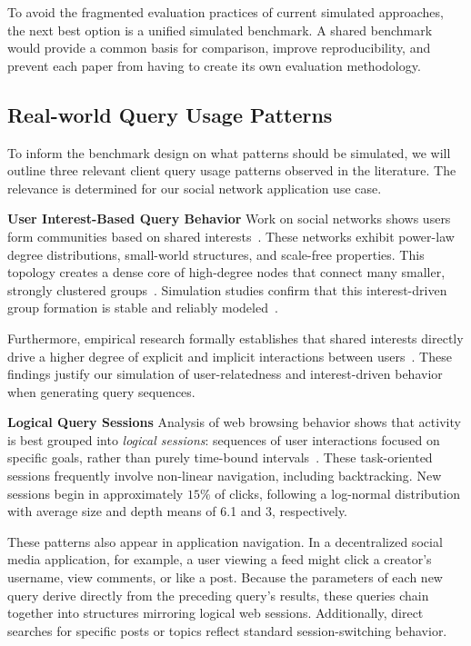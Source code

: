 To avoid the fragmented evaluation practices of current simulated approaches,
the next best option is a unified simulated benchmark. 
A shared benchmark would provide a common basis for comparison, improve reproducibility,
and prevent each paper from having to create its own evaluation methodology.

\subsection{Real-world Query Usage Patterns}
\label{sec:related_work_qup}
To inform the benchmark design on what patterns should be simulated, we will outline three relevant client query usage patterns observed in the literature. The relevance is determined for our social network application use case.

\textbf{User Interest-Based Query Behavior}
Work on social networks shows users form communities based on shared interests~\cite{mislove2007measurement,clark2007understanding,backstrom2006group,kalaitzakis2012evolution}. 
These networks exhibit power-law degree distributions, small-world structures, and scale-free properties. 
This topology creates a dense core of high-degree nodes that connect many smaller, strongly clustered groups~\cite{mislove2007measurement}. 
Simulation studies confirm that this interest-driven group formation is stable and reliably modeled~\cite{amblard2015models,hamill2009social}.

Furthermore, empirical research formally establishes that shared interests directly drive a higher degree of explicit and implicit interactions between users~\cite{mitzlaff2013user}. 
These findings justify our simulation of user-relatedness and interest-driven behavior when generating query sequences.

\textbf{Logical Query Sessions}
Analysis of web browsing behavior shows that activity is best grouped into \emph{logical sessions}: sequences of user interactions focused on specific goals, 
rather than purely time-bound intervals~\cite{meiss_whats_2009,sadagopan2008characterizing,schneider2009understanding}. 
These task-oriented sessions frequently involve non-linear navigation, 
including backtracking. 
New sessions begin in approximately $15\%$ of clicks, 
following a log-normal distribution with average size and depth means of 6.1 and 3, respectively. 

These patterns also appear in application navigation. 
In a decentralized social media application, for example, 
a user viewing a feed might click a creator's username, view comments, or like a post. 
Because the parameters of each new query derive directly from the preceding query's results, 
these queries chain together into structures mirroring logical web sessions. 
Additionally, direct searches for specific posts or topics reflect standard session-switching behavior. 

